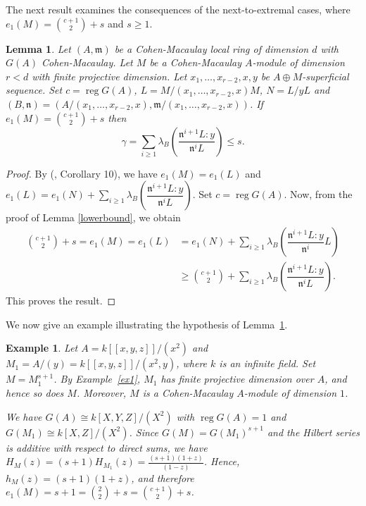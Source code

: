 \documentclass[11pt]{amsart}
\theoremstyle{plain}
\newtheorem{lemma}[theorem]{Lemma}
\newtheorem{example}[theorem]{Example}
\newcommand{\m}{\mathfrak{m}}
\newcommand{\n}{\mathfrak{n}}
\newcommand{\reg}{\operatorname{reg}}
\theoremstyle{plain}
\begin{document}
The next result examines the consequences of the next-to-extremal cases, where $e_1(M)=\binom{c+1}{2}+s$ and $s\geq 1$.

\begin{lemma}\label{implemma}
     Let $(A,\m)$ be a Cohen-Macaulay local ring of dimension $d$ with $G(A)$ Cohen-Macaulay. Let $M$ be a Cohen-Macaulay $A$-module of dimension $r<d$ with finite projective dimension. Let $x_1,\ldots ,x_{r-2},x,y$ be $A\oplus M$-superficial sequence. Set $c=\reg G(A)$, $L=M/(x_1,\ldots ,x_{r-2},x)M$, $N=L/yL$ and  $(B,\n)=(A/(x_1,\ldots ,x_{r-2},x),\m/(x_1,\ldots ,x_{r-2},x))$. If $e_1(M)=\binom{c+1}{2}+s$ then $$ \gamma=\sum_{i\geq 1} \lambda_B \left(\dfrac{\n^{i+1}L:y}{\n^iL }\right)\leq s.$$
\end{lemma}
\begin{proof}
     By (\cite{HCCMM}, Corollary 10), we have $e_1(M)=e_1(L)$ and $ e_1(L)=e_1(N)+\sum_{i\geq 1}\lambda_B \left(\dfrac{\n^{i+1}L:y}{\n^iL}\right)$. Set $c=\reg G(A).$ Now, from the proof of Lemma \ref{lowerbound}, we obtain
    \begin{equation*}
        \begin{split}
            \binom{c+1}{2}+s=e_1(M)=e_1(L)&=  e_1(N)+\sum_{i\geq 1}\lambda_B \left(\dfrac{\n^{i+1}L:y}{\n^i}L\right) \\ & \geq \binom{c+1}{2}+\sum_{i\geq 1}\lambda_B \left(\dfrac{\n^{i+1}L:y}{\n^iL}\right).
        \end{split}
    \end{equation*}
This proves the result.%
\end{proof}


We now give an example illustrating the hypothesis of Lemma~\ref{implemma}.
\begin{example}
    \normalfont
Let $A=k[[x,y,z]]/(x^2)$ and  $M_1=A/(y)=k[[x,y,z]]/(x^2,y)$, where $k$ is an infinite field. Set $M=M_1^{s+1}$. By Example~\ref{ex1}, $M_1$ has finite projective dimension over $A$, and hence so does $M$. Moreover, $M$ is a Cohen-Macaulay $A$-module of dimension $1$.

We have $G(A)\cong k[X,Y,Z]/(X^2)$ with $\operatorname{reg} G(A)=1$ and $G(M_1)\cong k[X,Z]/(X^2)$. Since $G(M)=G(M_1)^{s+1}$ and the Hilbert series is additive with respect to direct sums, we have
$\displaystyle H_M(z)=(s+1)H_{M_1}(z)=\frac{(s+1){(1+z)}}{(1-z)}$. Hence, $h_M(z)=(s+1)(1+z)$, and therefore $e_1(M)=s+1=\binom{2}{2}+s=\binom{c+1}{2}+s$.
\end{example}
\end{document}
